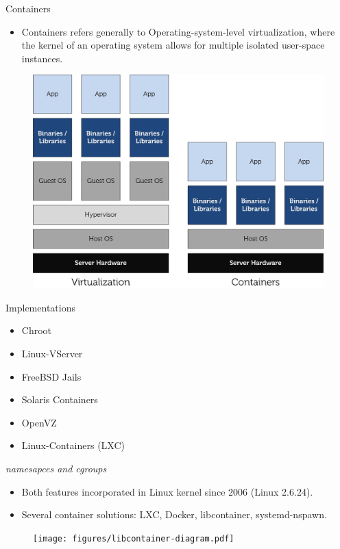 \documentclass[presentation]{beamer}
\begin{document}
\begin{frame}[label=sec-1-2]{Containers}
\begin{itemize}
\item \alert{Containers} refers generally to \alert{Operating-system-level virtualization},
where the \alert{kernel} of an operating system allows for multiple isolated \alert{user-space instances}.
\end{itemize}

\begin{figure}[!h]
  \center
  \includegraphics[scale=0.65]{figures/lxc-vm.jpg}
  \label{fig:hpc}
\end{figure}
\end{frame}

\begin{frame}[label=sec-1-3]{Implementations}
\begin{itemize}
\item Chroot
\item Linux-VServer
\item FreeBSD Jails
\item Solaris Containers
\item OpenVZ
\item Linux-Containers (LXC)
\end{itemize}
\end{frame}

\begin{frame}[label=sec-1-4]{\emph{namesapces and cgroups}}
\begin{itemize}
\item Both features incorporated in Linux kernel since 2006 (Linux 2.6.24).
\item Several container solutions: LXC, Docker, libcontainer, systemd-nspawn.
\end{itemize}

\begin{figure}[!h]
  \center
\texttt{[image: figures/libcontainer-diagram.pdf]}
  \label{fig:hpc}
\end{figure}
\end{frame}
\end{document}
